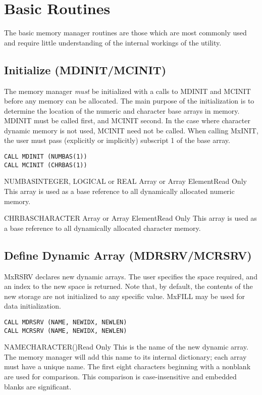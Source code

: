 \section{Basic Routines}\label{sec:mbas}
The basic memory manager routines are those which are most commonly used and
require little understanding of the internal workings of the utility.

\subsection{Initialize (MDINIT/MCINIT)}
The memory manager {\em must} be initialized with a calls to MDINIT and
MCINIT before any memory can be allocated.  The main purpose of the
initialization is to determine the location of the numeric and character
base arrays in memory. MDINIT must be called first, and MCINIT second. In
the case where character dynamic memory is not used, MCINIT need not be
called. When calling MxINIT, the user must pass (explicitly or
implicitly) subscript 1 of the base array.
\begin{verbatim}
CALL MDINIT (NUMBAS(1))
CALL MCINIT (CHRBAS(1))
\end{verbatim}

\begin{argy}{NUMBAS}{INTEGER, LOGICAL or REAL Array or Array Element}{Read
Only}
This array is used as a base reference to all dynamically allocated
numeric memory.
\end{argy}

\begin{argy}{CHRBAS}{CHARACTER Array or Array Element}{Read Only}
This array is used as a base reference to all dynamically allocated
character memory.
\end{argy}

\subsection{Define Dynamic Array (MDRSRV/MCRSRV)}
MxRSRV declares new dynamic arrays.  The user specifies the space
required, and an index to the new space is returned.  Note that, by
default, the contents of the new storage are not initialized to any specific
value. MxFILL may be used for data initialization.
\begin{verbatim}
CALL MDRSRV (NAME, NEWIDX, NEWLEN)
CALL MCRSRV (NAME, NEWIDX, NEWLEN)
\end{verbatim}

\begin{argy}{NAME}{CHARACTER\last(\last)}{Read Only}
This is the name of the new dynamic array. The memory manager will add this
name to its internal dictionary; each array must have a unique name.  The
first eight characters beginning with a nonblank are
used for comparison.
This comparison is case-insensitive and embedded blanks are
significant.
\end{argy}

